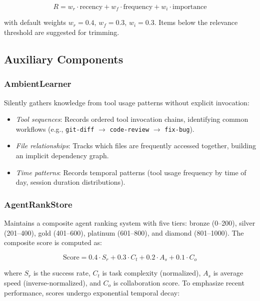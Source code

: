 \documentclass[journal,10pt]{IEEEtran}
\newcommand{\code}[1]{\texttt{#1}}
\begin{document}
\begin{equation}
R = w_r \cdot \text{recency} + w_f \cdot \text{frequency} + w_i \cdot \text{importance}
\label{eq:relevance}
\end{equation}

\noindent with default weights $w_r = 0.4$, $w_f = 0.3$, $w_i = 0.3$. Items below the relevance threshold are suggested for trimming.

\subsection{Auxiliary Components}

\subsubsection{AmbientLearner}

Silently gathers knowledge from tool usage patterns without explicit invocation:

\begin{itemize}[nosep]
\item \emph{Tool sequences}: Records ordered tool invocation chains, identifying common workflows (e.g., \code{git-diff} $\to$ \code{code-review} $\to$ \code{fix-bug}).
\item \emph{File relationships}: Tracks which files are frequently accessed together, building an implicit dependency graph.
\item \emph{Time patterns}: Records temporal patterns (tool usage frequency by time of day, session duration distributions).
\end{itemize}

\subsubsection{AgentRankStore}

Maintains a composite agent ranking system with five tiers: bronze (0--200), silver (201--400), gold (401--600), platinum (601--800), and diamond (801--1000). The composite score is computed as:

\begin{equation}
\text{Score} = 0.4 \cdot S_r + 0.3 \cdot C_t + 0.2 \cdot A_s + 0.1 \cdot C_o
\label{eq:rank}
\end{equation}

\noindent where $S_r$ is the success rate, $C_t$ is task complexity (normalized), $A_s$ is average speed (inverse-normalized), and $C_o$ is collaboration score. To emphasize recent performance, scores undergo exponential temporal decay:
\end{document}
